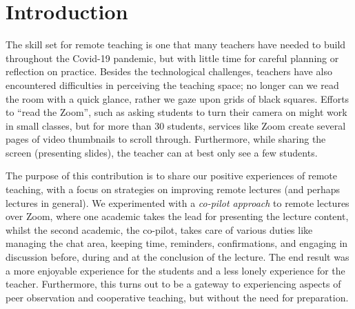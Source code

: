 \documentclass[sigconf,natbib=false]{acmart}
\begin{document}


\maketitle

\section{Introduction}

The skill set for remote teaching is one that many teachers have needed to  build throughout the Covid-19 pandemic, but with little time for careful planning or reflection on practice. Besides the technological challenges, teachers have also encountered difficulties in perceiving the teaching space; no longer can we read the room with a quick glance, rather we gaze upon grids of black squares. Efforts to \enquote{read the Zoom}, such as asking students to turn their camera on might work in small classes, but for more than 30 students, services like Zoom create several pages of video thumbnails to scroll through. Furthermore, while sharing the screen (\eg presenting slides), the teacher can at best only see a few students.

The purpose of this contribution is to share our positive experiences of remote 
teaching, with a focus on strategies on improving remote lectures (and perhaps 
lectures in general). We experimented with a \emph{co-pilot approach} to remote 
lectures over Zoom, where one academic takes the lead for presenting the 
lecture content, whilst the second academic, the co-pilot, takes care of 
various duties like managing the chat area, keeping time, reminders, 
confirmations, and engaging in discussion before, during and at the conclusion 
of the lecture. The end result was a more enjoyable experience for the students 
and a less lonely experience for the teacher. Furthermore, this turns out to be 
a gateway to experiencing aspects of peer observation and cooperative teaching, 
but without the need for preparation.
\end{document}
